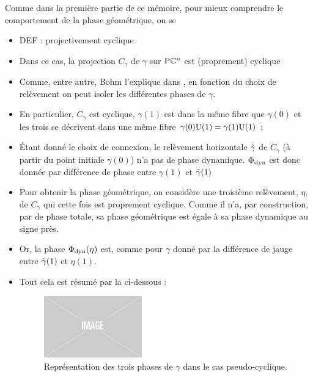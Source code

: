 Comme dans la première partie de ce mémoire, pour mieux comprendre le comportement de la phase géométrique, on se 

\begin{itemize}
	\item DEF : projectivement cyclique
	
	\item Dans ce cas, la projection $C_\gamma$ de $\gamma$ sur $\text{\normalfont P}\mathbb{C}^{n}$ est (proprement) cyclique
	
	\item Comme, entre autre, Bohm l'explique dans \cite{bohm_geometric_2003}, en fonction du choix de relèvement on peut isoler les différentes phases de $\gamma$. 
	
	\item En particulier, $C_\gamma$ est cyclique, $\gamma(1)$ est dans la même fibre que $\gamma(0)$ et les trois se décrivent dans une même fibre $\gamma(0)\text{\normalfont U}(1) = \gamma(1)\text{\normalfont U}(1)$ :
	
	\item Étant donné le choix de connexion, le relèvement horizontale $\Tilde{\gamma}$ de $C_\gamma$ (à partir du point initiale $\gamma(0)$) n'a pas de phase dynamique. $\Phi_{\text{\normalfont dyn}}$ est donc donnée par différence de phase entre $\gamma(1)$ et $\Tilde{\gamma}(1)$
	
	\item Pour obtenir la phase géométrique, on considère une troisième relèvement, $\eta$, de $C_\gamma$ qui cette fois est proprement cyclique. Comme il n'a, par construction, par de phase totale, sa phase géométrique est égale à sa phase dynamique au signe près.
	
	\item Or, la phase $\Phi_{\text{\normalfont dyn}}(\eta)$ est, comme pour $\gamma$ donné par la différence de jauge entre $\Tilde{\gamma}(1)$ et $\eta(1)$.
	
	\item Tout cela est résumé par la  ci-dessous :
	\begin{figure}[h]
		\includegraphics[width=0.4\textwidth]{fig/placeholder}
		\caption[Représentation des trois phases de $\gamma$ dans le cas pseudo-cyclique]{Représentation des trois phases de $\gamma$ dans le cas pseudo-cyclique.}
		\label{fig:phases_p-cycl}
	\end{figure}
	

\end{itemize}

